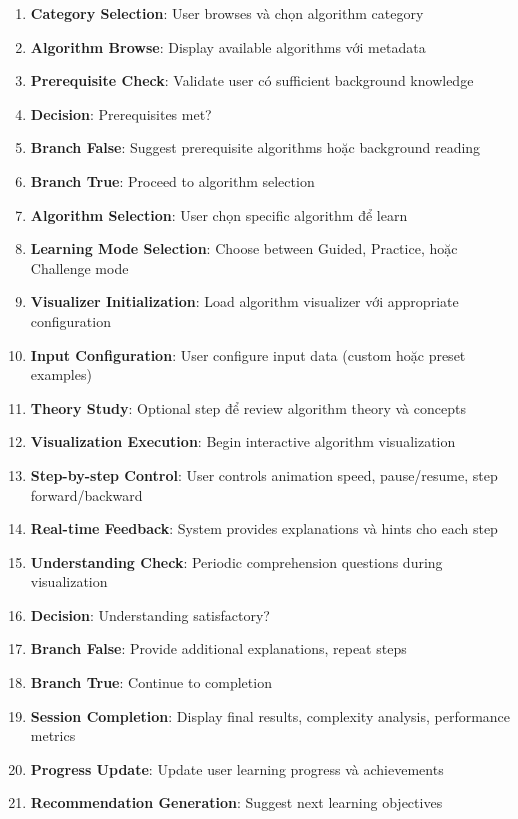 \begin{enumerate}
    \item \textbf{Category Selection}: User browses và chọn algorithm category
    \item \textbf{Algorithm Browse}: Display available algorithms với metadata
    \item \textbf{Prerequisite Check}: Validate user có sufficient background knowledge
    \item \textbf{Decision}: Prerequisites met?
    \item \textbf{Branch False}: Suggest prerequisite algorithms hoặc background reading
    \item \textbf{Branch True}: Proceed to algorithm selection
    \item \textbf{Algorithm Selection}: User chọn specific algorithm để learn
    \item \textbf{Learning Mode Selection}: Choose between Guided, Practice, hoặc Challenge mode
    \item \textbf{Visualizer Initialization}: Load algorithm visualizer với appropriate configuration
    \item \textbf{Input Configuration}: User configure input data (custom hoặc preset examples)
    \item \textbf{Theory Study}: Optional step để review algorithm theory và concepts
    \item \textbf{Visualization Execution}: Begin interactive algorithm visualization
    \item \textbf{Step-by-step Control}: User controls animation speed, pause/resume, step forward/backward
    \item \textbf{Real-time Feedback}: System provides explanations và hints cho each step
    \item \textbf{Understanding Check}: Periodic comprehension questions during visualization
    \item \textbf{Decision}: Understanding satisfactory?
    \item \textbf{Branch False}: Provide additional explanations, repeat steps
    \item \textbf{Branch True}: Continue to completion
    \item \textbf{Session Completion}: Display final results, complexity analysis, performance metrics
    \item \textbf{Progress Update}: Update user learning progress và achievements
    \item \textbf{Recommendation Generation}: Suggest next learning objectives
\end{enumerate}

